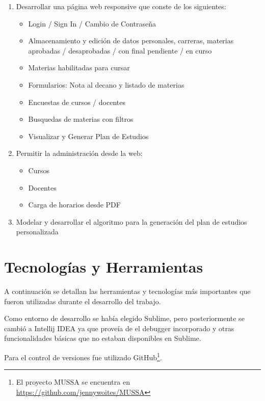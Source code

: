 \documentclass[a4paper]{article}
\begin{document}
\begin{enumerate}
	\item Desarrollar una página web responsive que conste de los siguientes:
		\begin{itemize}
			\item Login / Sign In / Cambio de Contraseña
			\item Almacenamiento y edición de datos personales, carreras, materias aprobadas / desaprobadas / con final pendiente / en curso
			\item Materias habilitadas para cursar
			\item Formularios: Nota al decano y listado de materias
			\item Encuestas de cursos / docentes
			\item Busquedas de materias con filtros
			\item Visualizar y Generar Plan de Estudios
		\end{itemize}

	\item Permitir la administración desde la web:
		\begin{itemize}
			\item Cursos
			\item Docentes
			\item Carga de horarios desde PDF
		\end{itemize}
		
	\item Modelar y desarrollar el algoritmo para la generación del plan de estudios personalizada
\end{enumerate}

\section{Tecnologías y Herramientas}

A continuación se detallan las herramientas y tecnologías más importantes que fueron utilizadas durante el desarrollo del trabajo.\newline

Como entorno de desarrollo se había elegido Sublime, pero posteriormente se cambió a Intellij IDEA ya que proveía de el debugger incorporado y otras funcionalidades básicas que no estaban disponibles en Sublime.\newline

Para el control de versiones fue utilizado GitHub\footnote{El proyecto MUSSA se encuentra en \url{https://github.com/jennywoites/MUSSA}}.\newline
\end{document}
